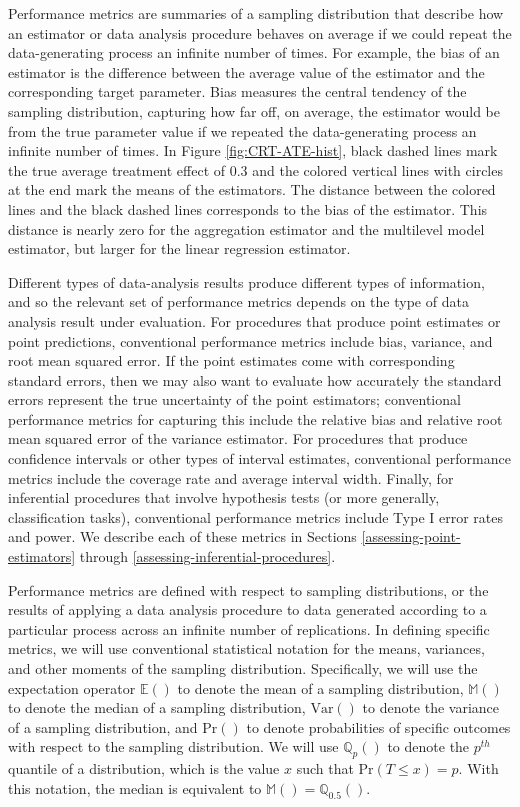 \documentclass[
]{book}
\newcommand{\Prob}{\text{Pr}}
\newcommand{\E}{\mathbb{E}}
\newcommand{\M}{\mathbb{M}}
\newcommand{\Q}{\mathbb{Q}}
\newcommand{\Var}{\text{Var}}
\begin{document}
Performance metrics are summaries of a sampling distribution that describe how an estimator or data analysis procedure behaves on average if we could repeat the data-generating process an infinite number of times.
For example, the bias of an estimator is the difference between the average value of the estimator and the corresponding target parameter.
Bias measures the central tendency of the sampling distribution, capturing how far off, on average, the estimator would be from the true parameter value if we repeated the data-generating process an infinite number of times.
In Figure \ref{fig:CRT-ATE-hist}, black dashed lines mark the true average treatment effect of 0.3 and the colored vertical lines with circles at the end mark the means of the estimators.
The distance between the colored lines and the black dashed lines corresponds to the bias of the estimator.
This distance is nearly zero for the aggregation estimator and the multilevel model estimator, but larger for the linear regression estimator.

Different types of data-analysis results produce different types of information, and so the relevant set of performance metrics depends on the type of data analysis result under evaluation.
For procedures that produce point estimates or point predictions, conventional performance metrics include bias, variance, and root mean squared error.
If the point estimates come with corresponding standard errors, then we may also want to evaluate how accurately the standard errors represent the true uncertainty of the point estimators; conventional performance metrics for capturing this include the relative bias and relative root mean squared error of the variance estimator.
For procedures that produce confidence intervals or other types of interval estimates, conventional performance metrics include the coverage rate and average interval width.
Finally, for inferential procedures that involve hypothesis tests (or more generally, classification tasks), conventional performance metrics include Type I error rates and power.
We describe each of these metrics in Sections \ref{assessing-point-estimators} through \ref{assessing-inferential-procedures}.

Performance metrics are defined with respect to sampling distributions, or the results of applying a data analysis procedure to data generated according to a particular process across an infinite number of replications.
In defining specific metrics, we will use conventional statistical notation for the means, variances, and other moments of the sampling distribution.
Specifically, we will use the expectation operator \(\E()\) to denote the mean of a sampling distribution, \(\M()\) to denote the median of a sampling distribution, \(\Var()\) to denote the variance of a sampling distribution, and \(\Prob()\) to denote probabilities of specific outcomes with respect to the sampling distribution.
We will use \(\Q_p()\) to denote the \(p^{th}\) quantile of a distribution, which is the value \(x\) such that \(\Prob(T \leq x) = p\). With this notation, the median is equivalent to \(\M() = \Q_{0.5}()\).
\end{document}
